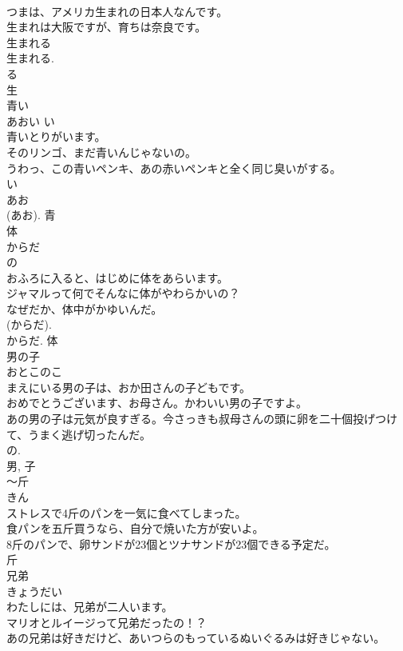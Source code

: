 \documentclass[8pt]{extreport}
\begin{document}
\begin{CJK}{UTF8}{min}
\\	つまは、アメリカ生まれの日本人なんです。	
\\	生まれは大阪ですが、育ちは奈良です。	
\\	生まれる 
\\	生まれる. 
\\	る 
\\	生	
\\	青い	
\\	あおい	い 
\\	青いとりがいます。	
\\	そのリンゴ、まだ青いんじゃないの。	
\\	うわっ、この青いペンキ、あの赤いペンキと全く同じ臭いがする。	
\\	い 
\\	あお 
\\	(あお).	青	
\\	体	
\\	からだ	
\\	の 
\\	おふろに入ると、はじめに体をあらいます。	
\\	ジャマルって何でそんなに体がやわらかいの？	
\\	なぜだか、体中がかゆいんだ。	
\\	(からだ). 
\\	からだ.	体	
\\	男の子	
\\	おとこのこ	
\\	まえにいる男の子は、おか田さんの子どもです。	
\\	おめでとうございます、お母さん。かわいい男の子ですよ。	
\\	あの男の子は元気が良すぎる。今さっきも叔母さんの頭に卵を二十個投げつけて、うまく逃げ切ったんだ。	
\\	の. 
\\	男, 子	
\\	〜斤	
\\	きん	
\\	ストレスで4斤のパンを一気に食べてしまった。	
\\	食パンを五斤買うなら、自分で焼いた方が安いよ。	
\\	8斤のパンで、卵サンドが23個とツナサンドが23個できる予定だ。	
\\	斤	
\\	兄弟	
\\	きょうだい	
\\	わたしには、兄弟が二人います。	
\\	マリオとルイージって兄弟だったの！？	
\\	あの兄弟は好きだけど、あいつらのもっているぬいぐるみは好きじゃない。	

\end{CJK}
\end{document}
